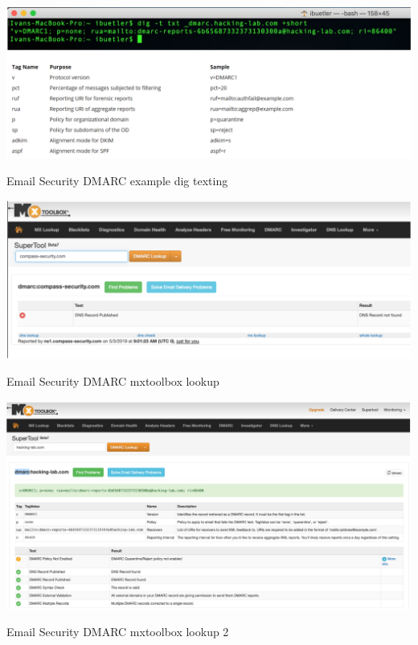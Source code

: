 \begin{table}[h]
  \centering
  \includegraphics[width=\textwidth]{resources/12-email-security-dmarc.png}
  \caption{Email Security DMARC example dig texting}
\end{table}

\begin{table}[h]
  \centering
  \includegraphics[width=\textwidth]{resources/12-email-security-dmarc-2.png}
  \caption{Email Security DMARC mxtoolbox lookup }
\end{table}

\begin{table}[h]
  \centering
  \includegraphics[width=\textwidth]{resources/12-email-security-dmarc-3.png}
  \caption{Email Security DMARC mxtoolbox lookup 2}
\end{table}

